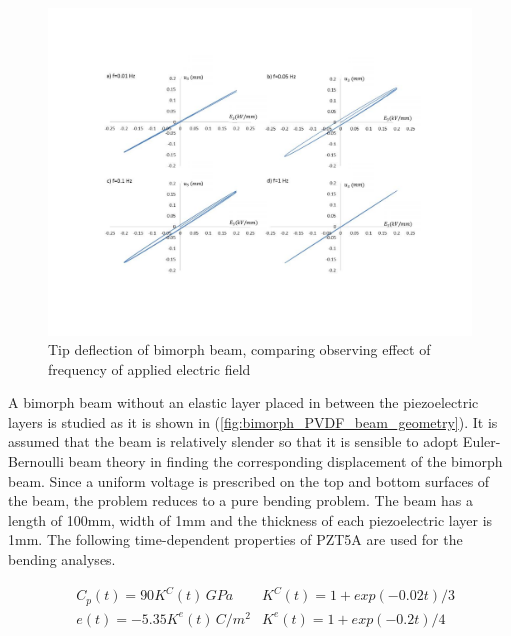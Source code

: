 \begin{figure}
\centering
\includegraphics[trim = 0mm 20mm 00mm 40mm,
clip=true,width=6.0in]{./chap_4_structural_analyses/pdf_beam/result_tip_deflection_of_bimorph_beam_frequencies.pdf}
\caption{Tip deflection of bimorph beam, comparing observing effect of frequency of applied electric field}
\label{fig:result_tip_deflection_of_bimorph_beam_frequency}
\end{figure}


A bimorph beam without an elastic layer placed in between the piezoelectric layers is studied as it is shown in (\ref{fig:bimorph_PVDF_beam_geometry}).
It is assumed that the beam is relatively slender so that it is sensible to adopt Euler-Bernoulli beam theory in finding the corresponding displacement of the bimorph beam.
Since a uniform voltage is prescribed on the top and bottom surfaces of the beam, the problem reduces to a pure bending problem.
The beam has a length of 100mm, width of 1mm and the thickness of each piezoelectric layer is 1mm.
The following time-dependent properties of PZT5A are used for the bending analyses.

\begin{equation}
\begin{aligned}
& C_p(t)=90 K^C(t) \, {GPa}      &K^C(t)=1+exp(-0.02 t)/3 \\
& e(t)=-5.35 K^e(t) \, C/m^2 &K^e(t)=1+exp(-0.2 t)/4
\label{Eqn:beam_frequency_material_properties}
\end{aligned}
\end{equation}

